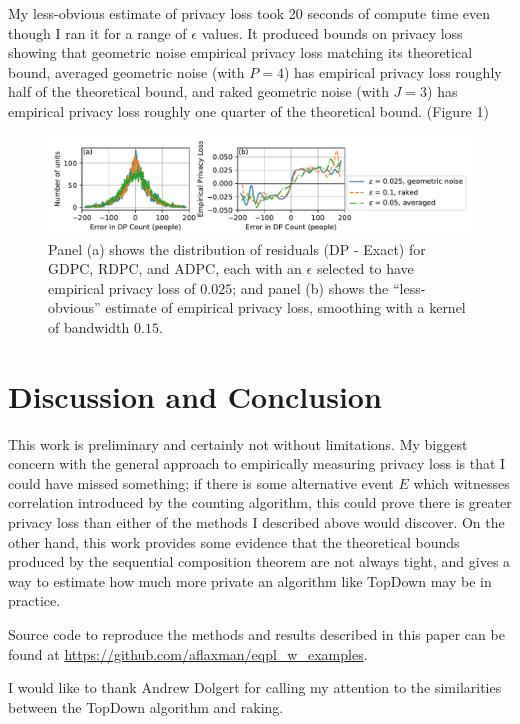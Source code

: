 \documentclass{article}
\begin{document}
My less-obvious estimate of privacy loss took 20 seconds of compute time even though I ran it for a range of $\epsilon$ values.  It produced bounds on privacy loss showing that geometric noise empirical privacy loss matching its theoretical bound, averaged geometric noise (with $P=4$) has empirical privacy loss roughly half of the theoretical bound, and raked geometric noise (with $J=3$) has empirical privacy loss roughly one quarter of the theoretical bound. (Figure 1)

\begin{figure}[h]
  \includegraphics[width=\linewidth]{fig.pdf}
 \caption{Panel (a) shows the distribution of residuals (DP - Exact) for
GDPC, RDPC, and ADPC, each with an $\epsilon$ selected to have empirical privacy loss of $0.025$; and panel (b) shows the ``less-obvious'' estimate of empirical privacy
loss, smoothing with a kernel of bandwidth
$0.15$.}
\end{figure}

\section{Discussion and Conclusion}

This work is preliminary and certainly not without limitations.  My biggest concern with the general approach to empirically measuring privacy loss is that I could have missed something; if there is some alternative event $E$ which witnesses correlation introduced by the counting algorithm, this could prove there is greater privacy loss than either of the methods I described above would discover.  On the other hand, this work provides some evidence that the theoretical bounds produced by the sequential composition theorem are not always tight, and gives a way to estimate how much more private an algorithm like TopDown may be in practice.



Source code to reproduce the methods and results described in this paper can be found at \url{https://github.com/aflaxman/eqpl_w_examples}.

I would like to thank Andrew Dolgert for calling my attention to the similarities between the TopDown algorithm and raking.
\end{document}
